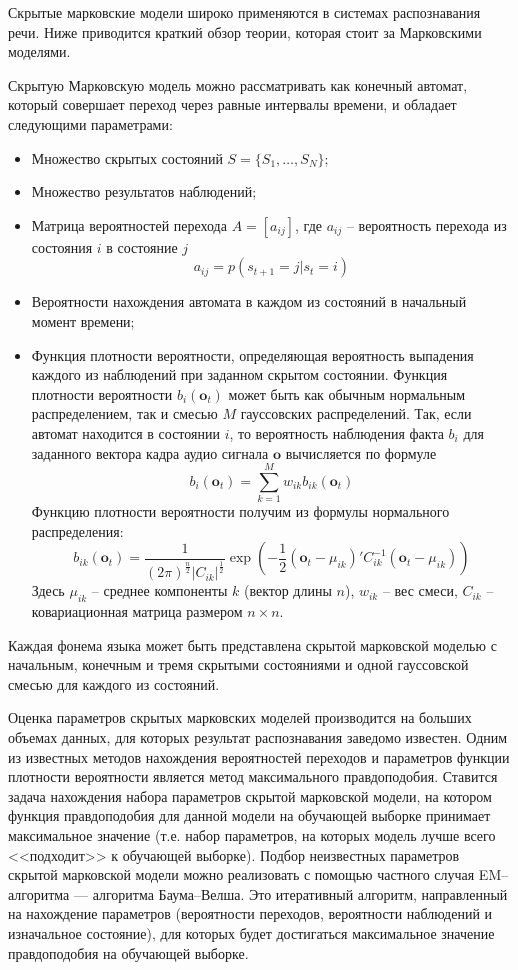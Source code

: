 Скрытые марковские модели широко применяются в системах распознавания речи. Ниже приводится краткий обзор теории, которая стоит за Марковскими моделями. 

Скрытую Марковскую модель можно рассматривать как конечный автомат, который совершает переход через равные интервалы времени, и обладает следующими параметрами:
\begin{itemize}
	\item Множество скрытых состояний $S = \{S_1, \dots, S_N\}$;
	\item Множество результатов наблюдений;
	\item Матрица вероятностей перехода $A = [a_{ij}]$, где $a_{ij}$ -- вероятность перехода из состояния $i$ в состояние $j$
	$$ a_{ij} = p(s_{t+1}=j|s_t=i)$$
	\item Вероятности нахождения автомата в каждом из состояний в начальный момент времени;
	\item Функция плотности вероятности, определяющая вероятность выпадения каждого из наблюдений при заданном скрытом состоянии. Функция плотности вероятности $b_i(\textbf{o}_t)$ может быть как обычным нормальным распределением, так и смесью $M$ гауссовских распределений. Так, если автомат находится в состоянии $i$, то вероятность наблюдения факта $b_i$ для заданного вектора кадра аудио сигнала $\textbf{o}$ вычисляется по формуле
	$$b_i(\textbf{o}_t) = \sum_{k=1}^{M}w_{ik}b_{ik}(\textbf{o}_t)$$
	Функцию плотности вероятности получим из формулы нормального распределения:
	$$b_{ik}(\textbf{o}_t) = \frac{1}{(2\pi)^\frac{n}{2} \left| C_{ik} \right|^\frac{1}{2}} \exp\left(-\frac{1}{2}\left(\textbf{o}_t - \mu_{ik}\right)' C^{-1}_{ik} \left(\textbf{o}_t - \mu_{ik}\right)\right)$$
	Здесь $\mu_{ik}$ -- среднее компоненты $k$ (вектор длины $n$), $w_{ik}$ -- вес смеси, $C_{ik}$ -- ковариационная матрица размером $n \times n$.
\end{itemize}

Каждая фонема языка может быть представлена скрытой марковской моделью с начальным, конечным и тремя скрытыми состояниями и одной гауссовской смесью для каждого из состояний.

Оценка параметров скрытых марковских моделей производится на больших объемах данных, для которых результат распознавания заведомо известен. Одним из известных методов нахождения вероятностей переходов и параметров функции плотности вероятности является метод максимального правдоподобия\cite[с.~342]{rabiner1993fundamentals}. Ставится задача нахождения набора параметров скрытой марковской модели, на котором функция правдоподобия для данной модели на обучающей выборке принимает максимальное значение (т.е. набор параметров, на которых модель лучше всего <<подходит>> к обучающей выборке). Подбор неизвестных параметров скрытой марковской модели можно реализовать с помощью частного случая EM--алгоритма\cite{dempster1977maximum} --- алгоритма Баума--Велша. Это итеративный алгоритм, направленный на нахождение параметров (вероятности переходов, вероятности наблюдений и изначальное состояние), для которых будет достигаться максимальное значение правдоподобия на обучающей выборке.

